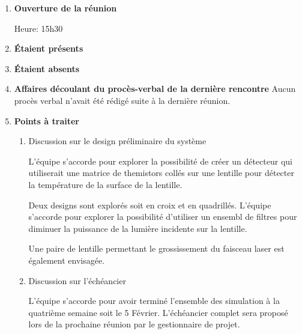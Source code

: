 \documentclass[12pt]{ULojpv}
\begin{document}
\entete
\begin{enumerate}

\item \textbf{Ouverture de la réunion}

Heure: 15h30

\item \textbf{Étaient présents}


\item \textbf{Étaient absents}

\item \textbf{Affaires découlant du procès-verbal de la dernière rencontre}
   Aucun procès verbal n'avait été rédigé suite à la dernière réunion.


\item \textbf{Points à traiter}
   \begin{enumerate}
      \item Discussion sur le design préliminaire du système
      
      L'équipe s'accorde pour explorer la possibilité de créer un détecteur qui utiliserait une matrice de 
      themistors collés sur une lentille pour détecter la température de la surface de la lentille. 
      
      Deux designs sont explorés soit en croix et en quadrillés. L'équipe s'accorde pour explorer la possibilité d'utiliser un ensembl
      de filtres pour diminuer la puissance de la lumière incidente sur la lentille. 

      
      Une paire de lentille permettant le grossissement du faisceau laser est également envisagée.

      \item Discussion sur l'échéancier
      
      L'équipe s'accorde pour avoir terminé l'ensemble des simulation à la quatrième semaine soit le 5 Février.
      L'échéancier complet sera proposé lors de la prochaine réunion par le gestionnaire de projet.


\end{enumerate}
\end{enumerate}
\end{document}
